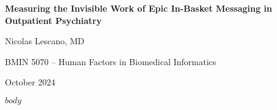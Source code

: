 \documentclass[11pt,letterpaper]{article}
\begin{document}
\begin{titlepage}
\centering
\vspace*{2cm}

{\Huge\bfseries Measuring the Invisible Work of Epic In-Basket Messaging in Outpatient Psychiatry\par}
\vspace{1cm}

{\Large Nicolas Lescano, MD\par}
\vspace{0.5cm}

{\large BMIN 5070 – Human Factors in Biomedical Informatics\par}
\vspace{0.5cm}

{\large October 2024\par}

\vfill

\end{titlepage}

\newpage
\tableofcontents
\newpage

$body$
\end{document}
